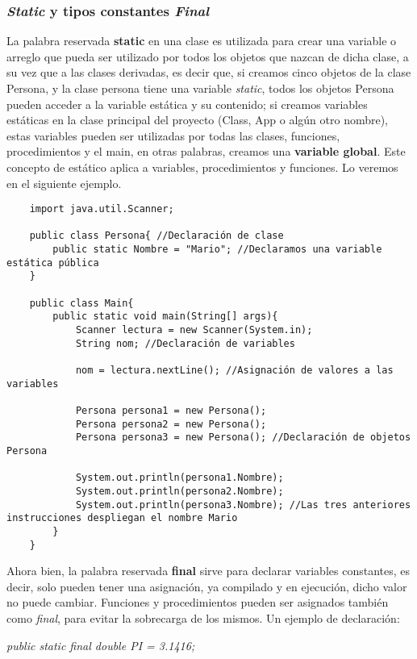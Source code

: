 \subsubsection{\textit{Static} y tipos constantes \textit{Final}}
\hspace{0.55cm}La palabra reservada \textbf{static} en una clase es utilizada para crear una variable o arreglo que pueda ser utilizado por todos los objetos que nazcan de dicha clase, a su vez que a las clases derivadas, es decir que, si creamos cinco objetos de la clase Persona, y la clase persona tiene una variable \textit{static}, todos los objetos Persona pueden acceder a la variable estática y su contenido; si creamos variables estáticas en la clase principal del proyecto (Class, App o algún otro nombre), estas variables pueden ser utilizadas por todas las clases, funciones, procedimientos y el main, en otras palabras, creamos una \textbf{variable global}. Este concepto de estático aplica a variables, procedimientos y funciones. Lo veremos en el siguiente ejemplo.
\begin{lstlisting}
    import java.util.Scanner;
    
    public class Persona{ //Declaración de clase
        public static Nombre = "Mario"; //Declaramos una variable estática pública
    }
    
    public class Main{
        public static void main(String[] args){
            Scanner lectura = new Scanner(System.in);
            String nom; //Declaración de variables
            
            nom = lectura.nextLine(); //Asignación de valores a las variables
            
            Persona persona1 = new Persona();
            Persona persona2 = new Persona();
            Persona persona3 = new Persona(); //Declaración de objetos Persona
            
            System.out.println(persona1.Nombre);
            System.out.println(persona2.Nombre);
            System.out.println(persona3.Nombre); //Las tres anteriores instrucciones despliegan el nombre Mario
        }
    }
\end{lstlisting}

Ahora bien, la palabra reservada \textbf{final} sirve para declarar variables constantes, es decir, solo pueden tener una asignación, ya compilado y en ejecución, dicho valor no puede cambiar. Funciones y procedimientos pueden ser asignados también como \textit{final}, para evitar la sobrecarga de los mismos. Un ejemplo de declaración:
\begin{center}
    \textit{public static final double PI = 3.1416;}
\end{center}


